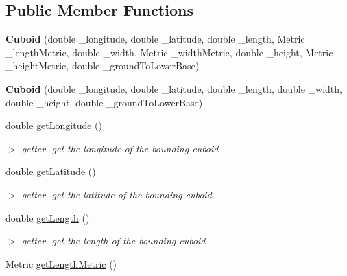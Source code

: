 \subsection*{\-Public \-Member \-Functions}
\begin{DoxyCompactItemize}
\item 
\hypertarget{classCuboid_a0035f798f5284b6af5f25ed88cb216e8}{{\bfseries \-Cuboid} (double \-\_\-longitude, double \-\_\-latitude, double \-\_\-length, \-Metric \-\_\-length\-Metric, double \-\_\-width, \-Metric \-\_\-width\-Metric, double \-\_\-height, \-Metric \-\_\-height\-Metric, double \-\_\-ground\-To\-Lower\-Base)}\label{classCuboid_a0035f798f5284b6af5f25ed88cb216e8}

\item 
\hypertarget{classCuboid_aa2bd1dcbfd72948c2396f379bc2343c0}{{\bfseries \-Cuboid} (double \-\_\-longitude, double \-\_\-latitude, double \-\_\-length, double \-\_\-width, double \-\_\-height, double \-\_\-ground\-To\-Lower\-Base)}\label{classCuboid_aa2bd1dcbfd72948c2396f379bc2343c0}

\item 
\hypertarget{classCuboid_a7e020aa4d4a3f4a18fb66f5508a37e7c}{double \hyperlink{classCuboid_a7e020aa4d4a3f4a18fb66f5508a37e7c}{get\-Longitude} ()}\label{classCuboid_a7e020aa4d4a3f4a18fb66f5508a37e7c}

\begin{DoxyCompactList}\small\item\em $>$ getter. get the longitude of the bounding cuboid \end{DoxyCompactList}\item 
\hypertarget{classCuboid_a4a64680a0f69c85bd5d973665e974d45}{double \hyperlink{classCuboid_a4a64680a0f69c85bd5d973665e974d45}{get\-Latitude} ()}\label{classCuboid_a4a64680a0f69c85bd5d973665e974d45}

\begin{DoxyCompactList}\small\item\em $>$ getter. get the latitude of the bounding cuboid \end{DoxyCompactList}\item 
\hypertarget{classCuboid_a2ba0dd1e23699927d1e3f3d0189d2f33}{double \hyperlink{classCuboid_a2ba0dd1e23699927d1e3f3d0189d2f33}{get\-Length} ()}\label{classCuboid_a2ba0dd1e23699927d1e3f3d0189d2f33}

\begin{DoxyCompactList}\small\item\em $>$ getter. get the length of the bounding cuboid \end{DoxyCompactList}\item 
\hypertarget{classCuboid_a105cff168c3775658a9e4fb02a69d2a5}{\-Metric \hyperlink{classCuboid_a105cff168c3775658a9e4fb02a69d2a5}{get\-Length\-Metric} ()}\label{classCuboid_a105cff168c3775658a9e4fb02a69d2a5}


\end{DoxyCompactItemize}
